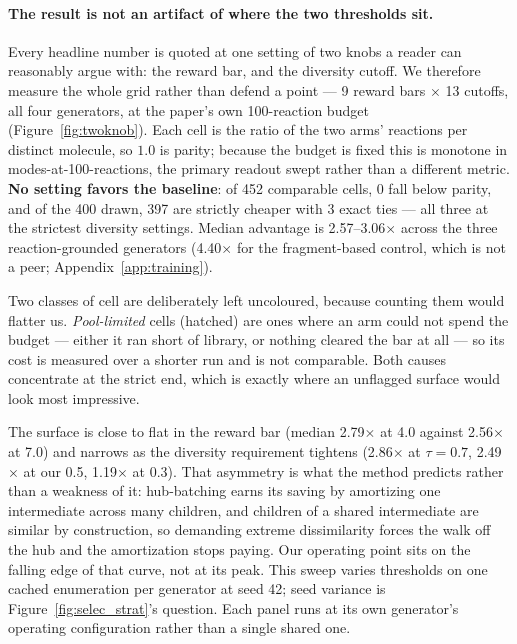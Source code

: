 \documentclass{article}
\newcommand{\checkval}[1]{#1}
\begin{document}
\paragraph{The result is not an artifact of where the two thresholds sit.}
Every headline number is quoted at one setting of two knobs a reader can reasonably
argue with: the reward bar, and the diversity cutoff. We therefore measure the whole
grid rather than defend a point --- \checkval{9} reward bars $\times$ \checkval{13}
cutoffs, all four generators, at the paper's own 100-reaction budget
(Figure~\ref{fig:twoknob}). Each cell is the ratio of the two arms' reactions per
distinct molecule, so $1.0$ is parity; because the budget is fixed this is monotone in
modes-at-100-reactions, the primary readout swept rather than a different metric.
\textbf{No setting favors the baseline}: of \checkval{452} comparable cells,
\checkval{0} fall below parity, and of the \checkval{400} drawn, \checkval{397} are
strictly cheaper with \checkval{3} exact ties --- all three at the strictest diversity
settings. Median advantage is \checkval{2.57--3.06$\times$} across the three
reaction-grounded generators (\checkval{4.40$\times$} for the fragment-based control,
which is not a peer; Appendix~\ref{app:training}).

Two classes of cell are deliberately left uncoloured, because counting them would
flatter us. \emph{Pool-limited} cells (hatched) are ones where an arm could not spend
the budget --- either it ran short of library, or nothing cleared the bar at all --- so
its cost is measured over a shorter run and is not comparable. Both causes concentrate
at the strict end, which is exactly where an unflagged surface would look most
impressive.

The surface is close to flat in the reward bar (median \checkval{2.79$\times$} at
\checkval{4.0} against \checkval{2.56$\times$} at \checkval{7.0}) and narrows as the
diversity requirement tightens (\checkval{2.86$\times$} at $\tau=0.7$,
\checkval{2.49$\times$} at our \checkval{0.5}, \checkval{1.19$\times$} at
\checkval{0.3}). That asymmetry is what the method predicts rather than a weakness of
it: hub-batching earns its saving by amortizing one intermediate across many children,
and children of a shared intermediate are similar by construction, so demanding extreme
dissimilarity forces the walk off the hub and the amortization stops paying. Our
operating point sits on the falling edge of that curve, not at its peak. This sweep
varies thresholds on one cached enumeration per generator at seed 42; seed variance is
Figure~\ref{fig:selec_strat}'s question. Each panel runs at its own generator's operating
configuration rather than a single shared one.
\end{document}
